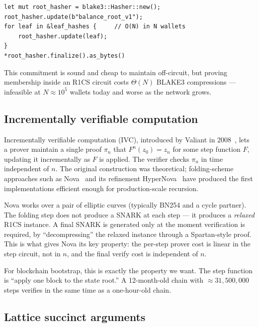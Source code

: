 \documentclass[11pt,a4paper]{article}
\begin{document}
\begin{lstlisting}[caption={Legacy state commitment in \texttt{crates/q-storage/src/lib.rs}.},label={lst:v1}]
let mut root_hasher = blake3::Hasher::new();
root_hasher.update(b"balance_root_v1");
for leaf in &leaf_hashes {     // O(N) in N wallets
    root_hasher.update(leaf);
}
*root_hasher.finalize().as_bytes()
\end{lstlisting}

This commitment is sound and cheap to maintain off-circuit, but proving membership
inside an R1CS circuit costs $\Theta(N)$ BLAKE3 compressions --- infeasible at
$N \approx 10^5$ wallets today and worse as the network grows.

\subsection{Incrementally verifiable computation}

Incrementally verifiable computation (IVC), introduced by Valiant in
2008~\cite{Valiant2008}, lets a prover maintain a single proof $\pi_n$ that
$F^n(z_0) = z_n$ for some step function $F$, updating it incrementally as
$F$ is applied. The verifier checks $\pi_n$ in time independent of $n$.
The original construction was theoretical; folding-scheme approaches such as
Nova~\cite{KothapalliSettyTzialla2021} and its refinement
HyperNova~\cite{KothapalliSetty2023HyperNova} have produced the first
implementations efficient enough for production-scale recursion.

Nova works over a pair of elliptic curves (typically BN254 and a cycle partner).
The folding step does not produce a SNARK at each step --- it produces a
\emph{relaxed} R1CS instance. A final SNARK is generated only at the moment
verification is required, by ``decompressing'' the relaxed instance through
a Spartan-style proof. This is what gives Nova its key property: the per-step
prover cost is linear in the step circuit, not in $n$, and the final verify cost
is independent of $n$.

For blockchain bootstrap, this is exactly the property we want.
The step function is ``apply one block to the state root.''
A 12-month-old chain with $\approx 31{,}500{,}000$ steps verifies in the same
time as a one-hour-old chain.

\subsection{Lattice succinct arguments}
\end{document}
